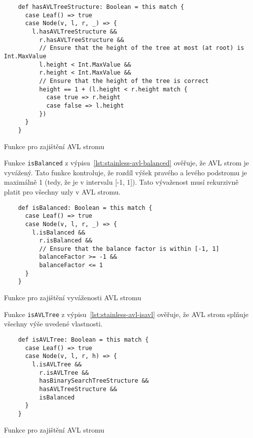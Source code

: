 \begin{listing}[H]
  \begin{verbatim}
    def hasAVLTreeStructure: Boolean = this match {
      case Leaf() => true
      case Node(v, l, r, _) => {
        l.hasAVLTreeStructure &&
          r.hasAVLTreeStructure &&
          // Ensure that the height of the tree at most (at root) is Int.MaxValue
          l.height < Int.MaxValue &&
          r.height < Int.MaxValue &&
          // Ensure that the height of the tree is correct
          height == 1 + (l.height < r.height match {
            case true => r.height
            case false => l.height
          })
      }
    }
  \end{verbatim}
  \caption{Funkce pro zajištění AVL stromu}
  \label{lst:stainless-avl-avl}
\end{listing}


Funkce \texttt{isBalanced} z výpisu~\ref{lst:stainless-avl-balanced}
ověřuje, že AVL strom je vyvážený.
Tato funkce kontroluje, že rozdíl výšek pravého a levého podstromu
je maximálně 1 (tedy, že je v intervalu [-1, 1]).
Tato vývaženost musí rekurzivně platit pro všechny uzly v AVL stromu.

\begin{listing}[H]
  \begin{verbatim}
    def isBalanced: Boolean = this match {
      case Leaf() => true
      case Node(v, l, r, _) => {
        l.isBalanced &&
          r.isBalanced &&
          // Ensure that the balance factor is within [-1, 1]
          balanceFactor >= -1 &&
          balanceFactor <= 1
      }
    }
  \end{verbatim}
  \caption{Funkce pro zajištění vyváženosti AVL stromu}
  \label{lst:stainless-avl-balanced}
\end{listing}

Funkce \texttt{isAVLTree} z výpisu~\ref{lst:stainless-avl-isavl}
ověřuje, že AVL strom splňuje všechny výše uvedené vlastnosti.

\begin{listing}[H]
  \begin{verbatim}
    def isAVLTree: Boolean = this match {
      case Leaf() => true
      case Node(v, l, r, h) => {
        l.isAVLTree &&
          r.isAVLTree &&
          hasBinarySearchTreeStructure &&
          hasAVLTreeStructure &&
          isBalanced
      }
    }
  \end{verbatim}
  \caption{Funkce pro zajištění AVL stromu}
  \label{lst:stainless-avl-isavl}
\end{listing}

